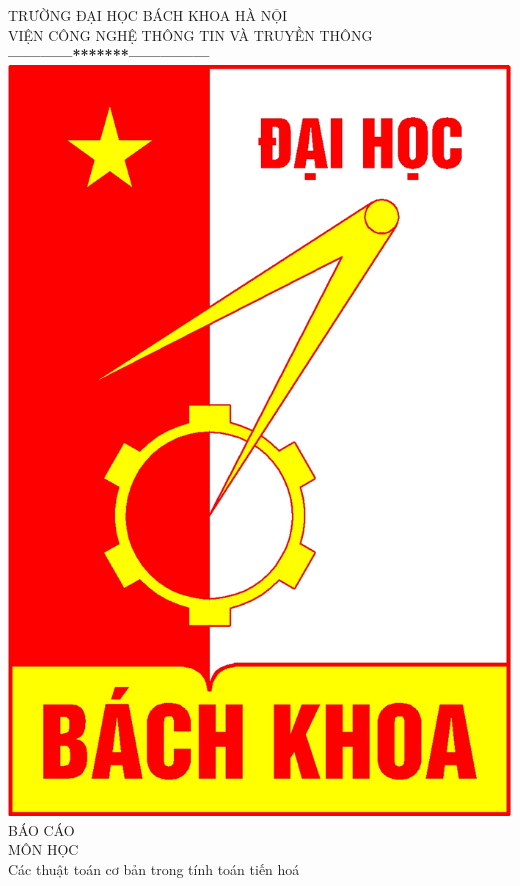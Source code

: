 \documentclass[a4paper,12pt]{report}
\begin{document}
\thispagestyle{empty}
\thisfancypage{
\setlength{\fboxrule}{1pt}
\doublebox}{}

\begin{center}
{\fontsize{16}{19}\selectfont TRƯỜNG ĐẠI HỌC BÁCH KHOA HÀ NỘI\\
VIỆN CÔNG NGHỆ THÔNG TIN VÀ TRUYỀN THÔNG}\\
\textbf{------------*******---------------}\\[1cm]
\includegraphics[scale=0.13]{hust.jpg}\\[1.3cm]
{\fontsize{32}{43}\selectfont BÁO CÁO}\\[0.1cm]
{\fontsize{38}{45}\selectfont MÔN HỌC}\\[0.2cm]
{\fontsize{20}{24}\selectfont Các thuật toán cơ bản trong tính toán tiến hoá}\\[0.3cm]

\end{center}
\end{document}
